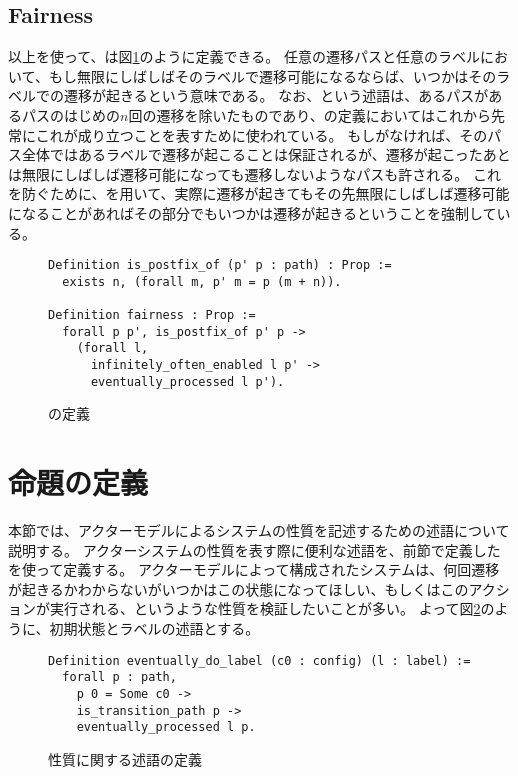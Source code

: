 \subsection{Fairness}
以上を使って、\fairness は図\ref{code:formalization:fairness}のように定義できる。
任意の遷移パスと任意のラベルにおいて、もし無限にしばしばそのラベルで遷移可能になるならば、いつかはそのラベルでの遷移が起きるという意味である。
なお、という述語は、あるパスがあるパスのはじめの$n$回の遷移を除いたものであり、\fairness の定義においてはこれから先常にこれが成り立つことを表すために使われている。
もしがなければ、そのパス全体ではあるラベルで遷移が起こることは保証されるが、遷移が起こったあとは無限にしばしば遷移可能になっても遷移しないようなパスも許される。
これを防ぐために、を用いて、実際に遷移が起きてもその先無限にしばしば遷移可能になることがあればその部分でもいつかは遷移が起きるということを強制している。

\begin{figure}
\begin{lstlisting}
Definition is_postfix_of (p' p : path) : Prop :=
  exists n, (forall m, p' m = p (m + n)).

Definition fairness : Prop :=
  forall p p', is_postfix_of p' p ->
    (forall l,
      infinitely_often_enabled l p' ->
      eventually_processed l p').
\end{lstlisting}
\label{code:formalization:fairness}
\caption{\fairness の定義}
\end{figure}

\section{命題の定義}

本節では、アクターモデルによるシステムの性質を記述するための述語について説明する。
アクターシステムの性質を表す際に便利な述語を、前節で定義したを使って定義する。
アクターモデルによって構成されたシステムは、何回遷移が起きるかわからないがいつかはこの状態になってほしい、もしくはこのアクションが実行される、というような性質を検証したいことが多い。
よって図\ref{code:proof:ev-do-label}のように、初期状態とラベルの述語とする。

\begin{figure}
\begin{lstlisting}
Definition eventually_do_label (c0 : config) (l : label) :=
  forall p : path,
    p 0 = Some c0 ->
    is_transition_path p ->
    eventually_processed l p.
\end{lstlisting}
\label{code:proof:ev-do-label}
\caption{性質に関する述語の定義}
\end{figure}

